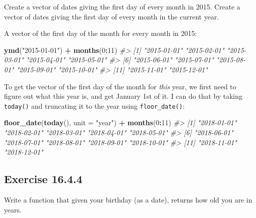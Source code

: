 \documentclass[]{book}
\newenvironment{Shaded}{\begin{snugshade}}{\end{snugshade}}
\newcommand{\CommentTok}[1]{\textcolor[rgb]{0.56,0.35,0.01}{\textit{#1}}}
\newcommand{\ControlFlowTok}[1]{\textcolor[rgb]{0.13,0.29,0.53}{\textbf{#1}}}
\newcommand{\DataTypeTok}[1]{\textcolor[rgb]{0.13,0.29,0.53}{#1}}
\newcommand{\DecValTok}[1]{\textcolor[rgb]{0.00,0.00,0.81}{#1}}
\newcommand{\KeywordTok}[1]{\textcolor[rgb]{0.13,0.29,0.53}{\textbf{#1}}}
\newcommand{\NormalTok}[1]{#1}
\newcommand{\OperatorTok}[1]{\textcolor[rgb]{0.81,0.36,0.00}{\textbf{#1}}}
\newcommand{\StringTok}[1]{\textcolor[rgb]{0.31,0.60,0.02}{#1}}
\theoremstyle{plain}
\theoremstyle{remark}
\begin{document}
Create a vector of dates giving the first day of every month in 2015.
Create a vector of dates giving the first day of every month in the
current year.

A vector of the first day of the month for every month in 2015:

\begin{Shaded}
\begin{Highlighting}[]
\KeywordTok{ymd}\NormalTok{(}\StringTok{"2015-01-01"}\NormalTok{) }\OperatorTok{+}\StringTok{ }\KeywordTok{months}\NormalTok{(}\DecValTok{0}\OperatorTok{:}\DecValTok{11}\NormalTok{)}
\CommentTok{#>  [1] "2015-01-01" "2015-02-01" "2015-03-01" "2015-04-01" "2015-05-01"}
\CommentTok{#>  [6] "2015-06-01" "2015-07-01" "2015-08-01" "2015-09-01" "2015-10-01"}
\CommentTok{#> [11] "2015-11-01" "2015-12-01"}
\end{Highlighting}
\end{Shaded}

To get the vector of the first day of the month for \emph{this} year, we
first need to figure out what this year is, and get January 1st of it. I
can do that by taking \texttt{today()} and truncating it to the year
using \texttt{floor\_date()}:

\begin{Shaded}
\begin{Highlighting}[]
\KeywordTok{floor_date}\NormalTok{(}\KeywordTok{today}\NormalTok{(), }\DataTypeTok{unit =} \StringTok{"year"}\NormalTok{) }\OperatorTok{+}\StringTok{ }\KeywordTok{months}\NormalTok{(}\DecValTok{0}\OperatorTok{:}\DecValTok{11}\NormalTok{)}
\CommentTok{#>  [1] "2018-01-01" "2018-02-01" "2018-03-01" "2018-04-01" "2018-05-01"}
\CommentTok{#>  [6] "2018-06-01" "2018-07-01" "2018-08-01" "2018-09-01" "2018-10-01"}
\CommentTok{#> [11] "2018-11-01" "2018-12-01"}
\end{Highlighting}
\end{Shaded}

\hypertarget{exercise-16.4.4}{%
\subsection*{\texorpdfstring{Exercise
{16.4.4}}{Exercise 16.4.4}}\label{exercise-16.4.4}}

Write a function that given your birthday (as a date), returns how old
you are in years.

\begin{Shaded}
\end{Shaded}
\end{document}
